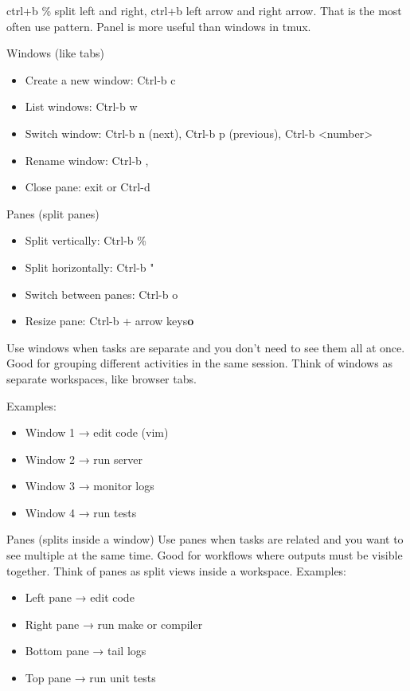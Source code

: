 \documentclass[paper=8.5in:11in, twoside, 12pt, pagesize=pdftex]{book}
\begin{document}
ctrl+b \% split left and right, ctrl+b left arrow and right arrow. That is the most often use pattern. Panel is more useful than windows in tmux.  


Windows (like tabs)
\begin{itemize}
\item Create a new window: Ctrl-b c

\item List windows: Ctrl-b w

\item Switch window: Ctrl-b n (next), Ctrl-b p (previous), Ctrl-b <number>

\item Rename window: Ctrl-b ,

\item Close pane: exit or Ctrl-d

\end{itemize}

Panes (split panes)
\begin{itemize}
\item Split vertically: Ctrl-b \%

\item Split horizontally: Ctrl-b "

\item Switch between panes: Ctrl-b o

\item Resize pane: Ctrl-b + arrow keys\textbf{o}
\end{itemize}


Use windows when tasks are separate and you don’t need to see them all at once. Good for grouping different activities in the same session. Think of windows as separate workspaces, like browser tabs.

Examples:
\begin{itemize}
\item Window 1 → edit code (vim)

\item Window 2 → run server

\item Window 3 → monitor logs

\item Window 4 → run tests
\end{itemize}


Panes (splits inside a window) Use panes when tasks are related and you want to see multiple at the same time. Good for workflows where outputs must be visible together. Think of panes as split views inside a workspace.
Examples:
\begin{itemize}
\item Left pane → edit code

\item Right pane → run make or compiler

\item Bottom pane → tail logs

\item Top pane → run unit tests

\end{itemize}
\end{document}
